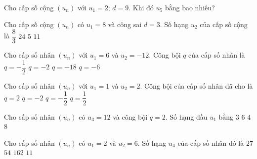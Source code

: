 \begin{ex}%
	Cho cấp số cộng $(u_n)$ với $u_1=2$; $d=9$. Khi đó $u_5$ bằng bao nhiêu?
\end{ex}

\begin{ex}%
Cho cấp số cộng $(u_n)$ có $u_1=8$ và công sai $d=3$. Số hạng $u_2$ của cấp số cộng là
\choice
{$\dfrac{8}{3}$}
{$24$}
{$5$}
{\True $11$}
\end{ex}

\begin{ex}%
	Cho cấp số nhân $(u_n)$ với $u_1=6$ và $u_2=-12$. Công bội $q$ của cấp số nhân là
	\choice
	{$q=-\dfrac{1}{2}$}
	{\True $q=-2$}
	{$q=-18$}
	{$q=-6$}
\end{ex}

\begin{ex}%
	Cho cấp số nhân $(u_n)$ với $u_1=1$ và $u_2=2$. Công bội của cấp số nhân đã cho là
	\choice
	{\True $q=2$}
	{$q=-2$}
	{$q=-\dfrac{1}{2}$}
	{$q=\dfrac{1}{2}$}
\end{ex}

\begin{ex}%
Cho cấp số nhân $(u_n)$ có $u_3=12$ và công bội $q=2$. Số hạng đầu $u_1$ bằng
\choice
{\True $3$}
{$6$}
{$4$}
{$8$}
\end{ex}

\begin{ex}%
	Cho cấp số nhân $(u_n)$ có $u_1 = 2$ và $u_2 = 6$. Số hạng $u_4$ của cấp số nhân đó là
	\choice
	{$27$}
	{\True $54$}
	{$162$}
	{$11$}
\end{ex}

